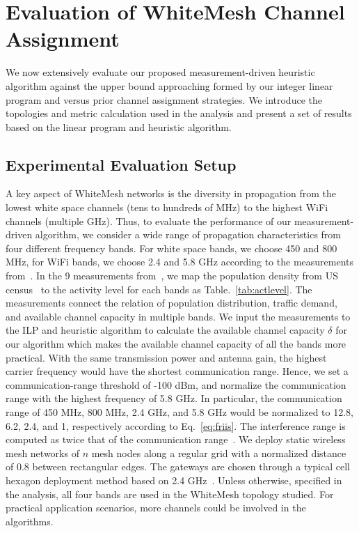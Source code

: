 \section{Evaluation of WhiteMesh Channel Assignment}
\label{sec:experimentdesign}


We now extensively evaluate our proposed measurement-driven heuristic 
algorithm against the upper bound approaching formed by our integer 
linear program and versus prior channel assignment strategies. We 
introduce the topologies and metric calculation used in the analysis 
and present a set of results based on the linear program and heuristic algorithm.

\subsection{Experimental Evaluation Setup}
\label{subsec:design}
A key aspect of WhiteMesh networks is the diversity in propagation from the lowest white
space channels (tens to hundreds of MHz) to the highest WiFi channels (multiple GHz). Thus, 
to evaluate the performance of our measurement-driven algorithm, we consider a wide range 
of propagation characteristics from four different frequency bands.  For white space bands, 
we choose 450 and 800 MHz, for WiFi bands, we choose 2.4 and 5.8 GHz according to the measurements
from~\cite{pcuiwinmee}. 
In the 9 measurements from~\cite{pcuiwinmee}, we map the population density from US 
census~\cite{uscensus} to the activity level for each bands as Table.~\ref{tab:actlevel}.
The measurements connect the relation of population distribution, traffic demand,
and available channel capacity in multiple bands. 
We input the measurements to the ILP and heuristic algorithm to calculate
the available channel capacity $\delta$ for our algorithm which makes the available channel 
capacity of all the bands more practical. With the same transmission
power and antenna gain, the highest carrier frequency would have the shortest communication range.
Hence, we set a communication-range threshold of -100 dBm, and normalize the communication 
range with the highest frequency of 5.8 GHz. In particular, the communication range of 
450 MHz, 800 MHz, 2.4 GHz, and 5.8 GHz would be normalized to 12.8, 6.2, 2.4, and 1, respectively 
according to Eq.~\ref{eq:friis}. The interference range is computed as twice that of the communication 
range~\cite{raniwala2005architecture}. We deploy static wireless mesh networks of $n$ 
mesh nodes along a regular grid with a normalized distance of 0.8 between rectangular edges. 
The gateways are chosen through a typical cell hexagon deployment method based on 2.4 GHz~\cite{meguerdichian2001exposure}.
Unless otherwise, specified in the analysis, all four bands are used in the WhiteMesh
topology studied. For practical application scenarios, more channels could be involved in the 
algorithms.


